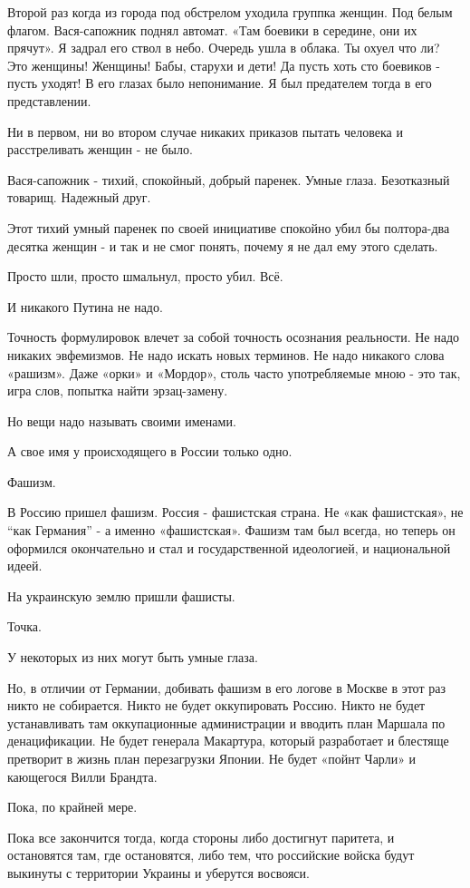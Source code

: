 Второй раз когда из города под обстрелом уходила группка женщин. Под белым
флагом. Вася-сапожник поднял автомат. «Там боевики в середине, они их прячут».
Я задрал его ствол в небо. Очередь ушла в облака. Ты охуел что ли? Это женщины!
Женщины! Бабы, старухи и дети! Да пусть хоть сто боевиков - пусть уходят! В его
глазах было непонимание. Я был предателем тогда в его представлении. 

Ни в первом, ни во втором случае никаких приказов пытать человека и
расстреливать женщин - не было. 

Вася-сапожник - тихий, спокойный, добрый паренек. Умные глаза. Безотказный
товарищ. Надежный друг. 

Этот тихий умный паренек по своей инициативе спокойно убил бы полтора-два
десятка женщин - и так и не смог понять, почему я не дал ему этого сделать. 

Просто шли, просто шмальнул, просто убил. Всё. 

И никакого Путина не надо. 

Точность формулировок влечет за собой точность осознания реальности. Не надо
никаких эвфемизмов. Не надо искать новых терминов. Не надо никакого слова
«рашизм». Даже «орки» и «Мордор», столь часто употребляемые мною - это так,
игра слов, попытка найти эрзац-замену. 

Но вещи надо называть своими именами. 

А свое имя у происходящего в России только одно. 

Фашизм. 

В Россию пришел фашизм. Россия - фашистская страна. Не «как фашистская», не
\enquote{как Германия} - а именно «фашистская». Фашизм там был всегда, но
теперь он оформился окончательно и стал и государственной идеологией, и
национальной идеей. 

На украинскую землю пришли фашисты. 

Точка. 

У некоторых из них могут быть умные глаза.

Но, в отличии от Германии, добивать фашизм в его логове в Москве в этот раз
никто не собирается. Никто не будет оккупировать Россию. Никто не будет
устанавливать там оккупационные администрации и вводить план Маршала по
денацификации. Не будет генерала Макартура, который разработает и блестяще
претворит в жизнь план перезагрузки Японии. Не будет «пойнт Чарли» и кающегося
Вилли Брандта. 

Пока, по крайней мере. 

Пока все закончится тогда, когда стороны либо достигнут паритета, и остановятся
там, где остановятся, либо тем, что российские войска будут выкинуты с
территории Украины и уберутся восвояси. 


